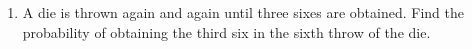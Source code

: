 \begin{enumerate}[label=\thechapter.\arabic*,ref=\thechapter.\theenumi]
\item A die is thrown again and again until three sixes are obtained. Find the probability of obtaining the third six in the sixth throw of the die.
\end{enumerate}
